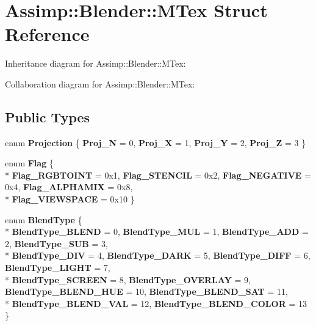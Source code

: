 \hypertarget{struct_assimp_1_1_blender_1_1_m_tex}{\section{Assimp\+:\+:Blender\+:\+:M\+Tex Struct Reference}
\label{struct_assimp_1_1_blender_1_1_m_tex}
}


Inheritance diagram for Assimp\+:\+:Blender\+:\+:M\+Tex\+:


Collaboration diagram for Assimp\+:\+:Blender\+:\+:M\+Tex\+:
\subsection*{Public Types}
\begin{DoxyCompactItemize}
\item 
\hypertarget{struct_assimp_1_1_blender_1_1_m_tex_a089fb1439cddc649e60d94e0903ff7b0}{enum {\bfseries Projection} \{ {\bfseries Proj\+\_\+\+N} = 0, 
{\bfseries Proj\+\_\+\+X} = 1, 
{\bfseries Proj\+\_\+\+Y} = 2, 
{\bfseries Proj\+\_\+\+Z} = 3
 \}}\label{struct_assimp_1_1_blender_1_1_m_tex_a089fb1439cddc649e60d94e0903ff7b0}

\item 
\hypertarget{struct_assimp_1_1_blender_1_1_m_tex_aa5177e0b2f2efaa43fe3c4eb62684315}{enum {\bfseries Flag} \{ \\*
{\bfseries Flag\+\_\+\+R\+G\+B\+T\+O\+I\+N\+T} = 0x1, 
{\bfseries Flag\+\_\+\+S\+T\+E\+N\+C\+I\+L} = 0x2, 
{\bfseries Flag\+\_\+\+N\+E\+G\+A\+T\+I\+V\+E} = 0x4, 
{\bfseries Flag\+\_\+\+A\+L\+P\+H\+A\+M\+I\+X} = 0x8, 
\\*
{\bfseries Flag\+\_\+\+V\+I\+E\+W\+S\+P\+A\+C\+E} = 0x10
 \}}\label{struct_assimp_1_1_blender_1_1_m_tex_aa5177e0b2f2efaa43fe3c4eb62684315}

\item 
\hypertarget{struct_assimp_1_1_blender_1_1_m_tex_a52fe96b89d06b881590e964bb2e827c4}{enum {\bfseries Blend\+Type} \{ \\*
{\bfseries Blend\+Type\+\_\+\+B\+L\+E\+N\+D} = 0, 
{\bfseries Blend\+Type\+\_\+\+M\+U\+L} = 1, 
{\bfseries Blend\+Type\+\_\+\+A\+D\+D} = 2, 
{\bfseries Blend\+Type\+\_\+\+S\+U\+B} = 3, 
\\*
{\bfseries Blend\+Type\+\_\+\+D\+I\+V} = 4, 
{\bfseries Blend\+Type\+\_\+\+D\+A\+R\+K} = 5, 
{\bfseries Blend\+Type\+\_\+\+D\+I\+F\+F} = 6, 
{\bfseries Blend\+Type\+\_\+\+L\+I\+G\+H\+T} = 7, 
\\*
{\bfseries Blend\+Type\+\_\+\+S\+C\+R\+E\+E\+N} = 8, 
{\bfseries Blend\+Type\+\_\+\+O\+V\+E\+R\+L\+A\+Y} = 9, 
{\bfseries Blend\+Type\+\_\+\+B\+L\+E\+N\+D\+\_\+\+H\+U\+E} = 10, 
{\bfseries Blend\+Type\+\_\+\+B\+L\+E\+N\+D\+\_\+\+S\+A\+T} = 11, 
\\*
{\bfseries Blend\+Type\+\_\+\+B\+L\+E\+N\+D\+\_\+\+V\+A\+L} = 12, 
{\bfseries Blend\+Type\+\_\+\+B\+L\+E\+N\+D\+\_\+\+C\+O\+L\+O\+R} = 13
 \}}\label{struct_assimp_1_1_blender_1_1_m_tex_a52fe96b89d06b881590e964bb2e827c4}


\end{DoxyCompactItemize}
